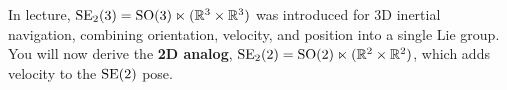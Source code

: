 \documentclass[../AAE590LGM_HW3.tex]{subfiles}
\begin{document}
In lecture, $\SEt{3} = \SO{3} \ltimes (\R[3] \times \R[3])$ was introduced for 3D inertial navigation, combining orientation, velocity, and position into a single Lie group. You will now derive the \textbf{2D analog}, $\SEt{2} = \SO{2} \ltimes (\R[2] \times \R[2])$, which adds velocity to the $\SE{2}$ pose.
\end{document}

